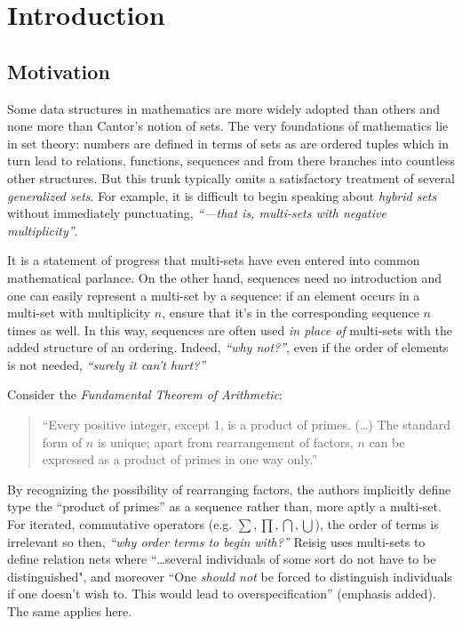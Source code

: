 \chapter{Introduction}
\doublespacing


\section{Motivation}


Some data structures in mathematics are more widely adopted than others and none more than Cantor's notion of sets.
The very foundations of mathematics lie in set theory: numbers are defined in terms of sets as are ordered tuples 
which in turn lead to relations, functions, sequences and from there branches into countless other structures.
But this trunk typically omits a satisfactory treatment of several \emph{generalized sets}.
For example, it is difficult to begin speaking about \emph{hybrid sets} without immediately punctuating, 
\emph{``---that is, multi-sets with negative multiplicity''}.


It is a statement of progress that multi-sets have even entered into common mathematical parlance.
On the other hand, sequences need no introduction and one can easily represent a multi-set by a sequence: 
if an element occurs in a multi-set with multiplicity $n$, ensure that it's in the corresponding sequence $n$ times as well.
In this way, sequences are often used \emph{in place of} multi-sets with the added structure of an ordering.
Indeed,  \emph{``why not?''}, even if the order of elements is not needed, \emph{``surely it can't hurt?''}


Consider the \emph{Fundamental Theorem of Arithmetic}:
\begin{quote}
	``Every positive integer, except 1, is a product of primes. 
	(\ldots) 
	The standard form of $n$ is unique; 
	apart from rearrangement of factors, $n$ can be expressed as a product of primes in one way only.''
\end{quote}
By recognizing the possibility of rearranging factors, the authors implicitly define type the ``product of primes'' as a sequence rather than, more aptly a multi-set.
For iterated, commutative operators (e.g. $\sum, \prod, \bigcap, \bigcup$), the order of terms is irrelevant so then, 
\emph{``why order terms to begin with?''}
Reisig \cite{reisig1985petri} uses multi-sets to define relation nets where 
``\ldots several individuals of some sort do not have to be distinguished", and moreover
 ``One \emph{should not} be forced to distinguish individuals if one doesn't wish to.  This would lead to overspecification''
(emphasis added). The same applies here.


